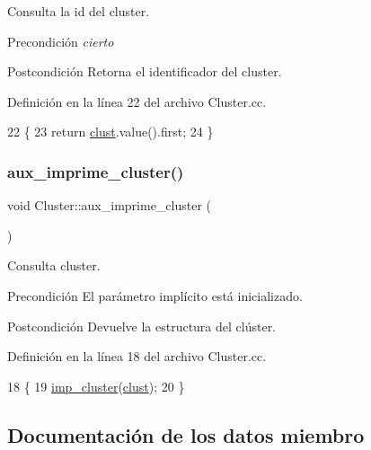 Consulta la id del cluster. 

\begin{DoxyPrecond}{Precondición}
{\itshape cierto} 
\end{DoxyPrecond}
\begin{DoxyPostcond}{Postcondición}
Retorna el identificador del cluster. 
\end{DoxyPostcond}


Definición en la línea 22 del archivo Cluster.\+cc.


\begin{DoxyCode}
22                                         \{
23     \textcolor{keywordflow}{return} \hyperlink{class_cluster_aaada1982eafeb072ce83cb6a3d5445e4}{clust}.value().first;
24 \}
\end{DoxyCode}
\mbox{\label{class_cluster_a07f366fa03061135057b1378d8b25777}} 
\subsubsection{\texorpdfstring{aux\+\_\+imprime\+\_\+cluster()}{aux\_imprime\_cluster()}}
{\footnotesize\ttfamily void Cluster\+::aux\+\_\+imprime\+\_\+cluster (\begin{DoxyParamCaption}{ }\end{DoxyParamCaption})}



Consulta cluster. 

\begin{DoxyPrecond}{Precondición}
El parámetro implícito está inicializado. 
\end{DoxyPrecond}
\begin{DoxyPostcond}{Postcondición}
Devuelve la estructura del clúster. 
\end{DoxyPostcond}


Definición en la línea 18 del archivo Cluster.\+cc.


\begin{DoxyCode}
18                                  \{
19     \hyperlink{class_cluster_a25c0220fbad15328b30df8f9cf0c845a}{imp\_cluster}(\hyperlink{class_cluster_aaada1982eafeb072ce83cb6a3d5445e4}{clust});
20 \}
\end{DoxyCode}


\subsection{Documentación de los datos miembro}
\mbox{\label{class_cluster_aaada1982eafeb072ce83cb6a3d5445e4}} 
